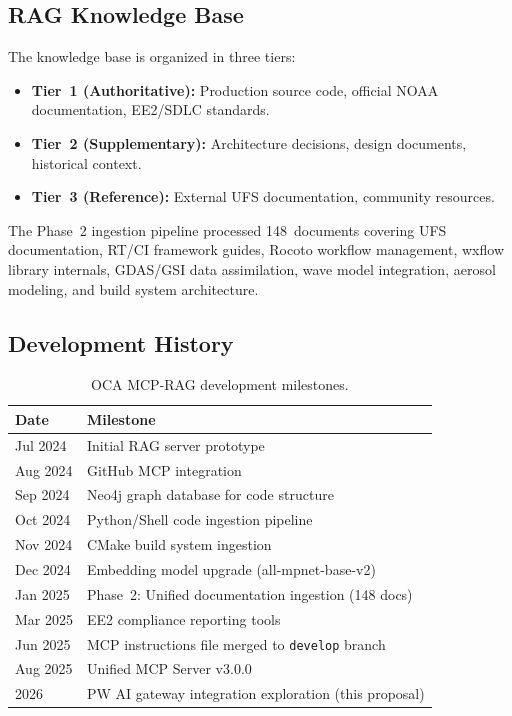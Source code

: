 \documentclass[11pt,letterpaper,twoside]{article}
\begin{document}
\subsection{RAG Knowledge Base}

The knowledge base is organized in three tiers:
\begin{itemize}
\item \textbf{Tier~1 (Authoritative):} Production source code, official NOAA
  documentation, EE2/SDLC standards.
\item \textbf{Tier~2 (Supplementary):} Architecture decisions, design
  documents, historical context.
\item \textbf{Tier~3 (Reference):} External UFS documentation, community
  resources.
\end{itemize}

The Phase~2 ingestion pipeline processed 148~documents covering UFS
documentation, RT/CI framework guides, Rocoto workflow management, wxflow
library internals, GDAS/GSI data assimilation, wave model integration,
aerosol modeling, and build system architecture.

\subsection{Development History}

\begin{table}[H]
\centering
\small
\caption{OCA MCP-RAG development milestones.}
\label{tab:history}
\begin{tabularx}{\textwidth}{L{2.6cm} X}
\toprule
\textbf{Date} & \textbf{Milestone} \\
\midrule
Jul 2024 & Initial RAG server prototype \\
Aug 2024 & GitHub MCP integration \\
Sep 2024 & Neo4j graph database for code structure \\
Oct 2024 & Python/Shell code ingestion pipeline \\
Nov 2024 & CMake build system ingestion \\
Dec 2024 & Embedding model upgrade (all-mpnet-base-v2) \\
Jan 2025 & Phase~2: Unified documentation ingestion (148 docs) \\
Mar 2025 & EE2 compliance reporting tools \\
Jun 2025 & MCP instructions file merged to \texttt{develop} branch \\
Aug 2025 & Unified MCP Server v3.0.0 \\
2026 & PW AI gateway integration exploration (this proposal) \\
\bottomrule
\end{tabularx}
\end{table}
\end{document}
